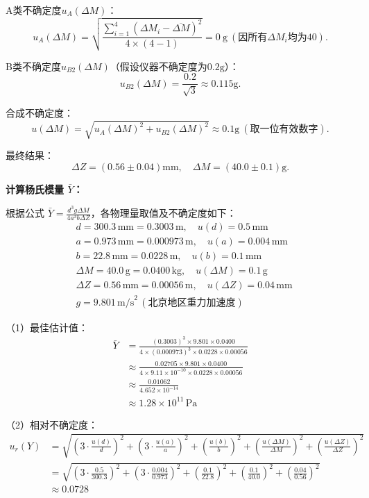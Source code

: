\documentclass[11pt]{article}
\begin{document}
\begin{enumerate}
A类不确定度\(u_A(\Delta M)\)：
\[
u_A(\Delta M) = \sqrt{\frac{\sum_{i=1}^{4} (\Delta M_i - \overline{\Delta M})^2}{4 \times (4 - 1)}} = 0\ \text{g}\ (\text{因所有}\Delta M_i\text{均为40}).
\]

B类不确定度\(u_{B2}(\Delta M)\)（假设仪器不确定度为\(0.2 \text{g}\)）：
\[
u_{B2}(\Delta M) = \frac{0.2}{\sqrt{3}} \approx 0.115 \text{g}.
\]

合成不确定度：
\[
u(\Delta M) = \sqrt{u_A(\Delta M)^2 + u_{B2}(\Delta M)^2} \approx 0.1 \text{g}\ (\text{取一位有效数字}).
\]


最终结果：
\[
\Delta Z = (0.56 \pm 0.04) \text{mm}, \quad \Delta M = (40.0 \pm 0.1) \text{g}.
\]
\end{enumerate}

\noindent\textbf{计算杨氏模量 \( \bar{Y} \)：}

根据公式 \( \bar{Y} = \frac{d^3 g \Delta M}{4a^3 b \Delta Z} \)，各物理量取值及不确定度如下：
\begin{align*}
&d = 300.3 \, \text{mm} = 0.3003 \, \text{m}, \quad u(d) = 0.5 \, \text{mm} \\
&a = 0.973 \, \text{mm} = 0.000973 \, \text{m}, \quad u(a) = 0.004 \, \text{mm} \\
&b = 22.8 \, \text{mm} = 0.0228 \, \text{m}, \quad u(b) = 0.1 \, \text{mm} \\
&\Delta M = 40.0 \, \text{g} = 0.0400 \, \text{kg}, \quad u(\Delta M) = 0.1 \, \text{g} \\
&\Delta Z = 0.56 \, \text{mm} = 0.00056 \, \text{m}, \quad u(\Delta Z) = 0.04 \, \text{mm} \\
&g = 9.801 \, \text{m/s}^2 \, (\text{北京地区重力加速度})
\end{align*}

\noindent（1）最佳估计值：
\begin{align*}
\bar{Y} &= \frac{(0.3003)^3 \times 9.801 \times 0.0400}{4 \times (0.000973)^3 \times 0.0228 \times 0.00056} \\
&\approx \frac{0.02705 \times 9.801 \times 0.0400}{4 \times 9.11 \times 10^{-10} \times 0.0228 \times 0.00056} \\
&\approx \frac{0.01062}{4.652 \times 10^{-14}} \\
&\approx 1.28 \times 10^{11} \, \text{Pa}
\end{align*}

\noindent（2）相对不确定度：
\begin{align*}
u_r(Y) &= \sqrt{\left(3 \cdot \frac{u(d)}{d}\right)^2 + \left(3 \cdot \frac{u(a)}{a}\right)^2 + \left(\frac{u(b)}{b}\right)^2 + \left(\frac{u(\Delta M)}{\Delta M}\right)^2 + \left(\frac{u(\Delta Z)}{\Delta Z}\right)^2} \\
&= \sqrt{\left(3 \cdot \frac{0.5}{300.3}\right)^2 + \left(3 \cdot \frac{0.004}{0.973}\right)^2 + \left(\frac{0.1}{22.8}\right)^2 + \left(\frac{0.1}{40.0}\right)^2 + \left(\frac{0.04}{0.56}\right)^2} \\
&\approx 0.0728
\end{align*}
\end{document}

